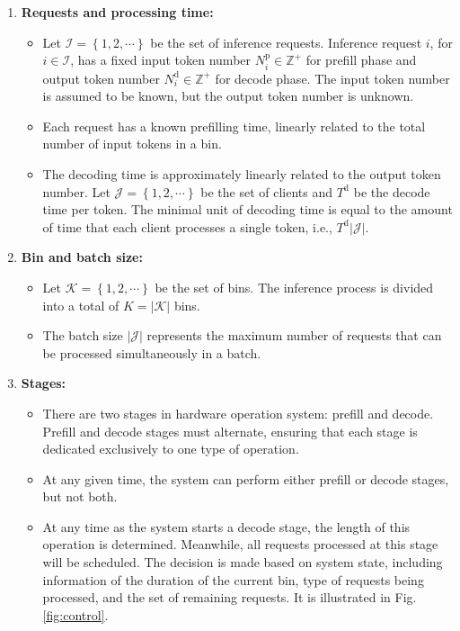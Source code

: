 \begin{enumerate}
    \item \textbf
{Requests and processing time:}
    \begin{itemize}
        \item Let \( \mathcal{I}=\left\{ 1,2,\cdots\right\} \) be the set of inference requests. Inference request $i$, for $i \in \mathcal{I}$, has a fixed input token number $N^\text{p}_i \in  \mathbb{Z}^+$ for prefill phase and output token number $N^\text{d}_i \in  \mathbb{Z}^+$ for decode phase. The input token number is assumed to be known, but the output token number is unknown.
        \item Each request has a known prefilling time, linearly related to the total number of input tokens in a bin.
        \item The decoding time is approximately linearly related to the output token number. Let $\mathcal{J}=\left\{1,2,\cdots \right\}$ be the set of clients and $T^\text{d}$ be the decode time per token. The minimal unit of decoding time is equal to the amount of time that each client processes a single token, i.e., $T^\text{d}|\mathcal{J}|$.
    \end{itemize}
    \item \textbf{Bin and batch size:}
    \begin{itemize}
        \item Let $\mathcal{K}=\left\{1,2,\cdots \right\}$ be the set of bins. The inference process is divided into a total of \( K=|\mathcal{K}| \) bins.
        \item The batch size \( |\mathcal{J}| \) represents the maximum number of requests that can be processed simultaneously in a batch.
    \end{itemize}
    \item \textbf{Stages:}
    \begin{itemize}
        \item There are two stages in hardware operation system: prefill and decode. Prefill and decode stages must alternate, ensuring that each stage is dedicated exclusively to one type of operation.
        \item At any given time, the system can perform either prefill or decode stages, but not both.
        \item At any time as the system starts a decode stage, the length of this operation is determined. Meanwhile, all requests processed at this stage will be scheduled. The decision is made based on system state, including information of the duration of the current bin, type of requests being processed, and the set of remaining requests. It is illustrated in Fig. \ref{fig:control}.

\end{itemize}
\end{enumerate}
